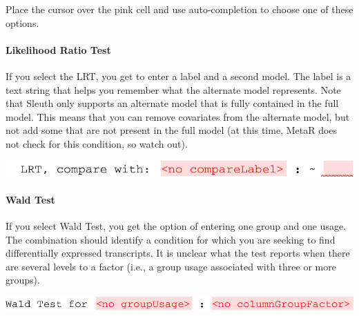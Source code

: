 Place the cursor over the pink cell and use auto-completion to choose one of these options. 
\paragraph{Likelihood Ratio Test}
If you select the LRT, you get to enter a label and a second model. The label is a text string that helps you remember what the alternate model represents. Note that Sleuth only supports an alternate model that is fully contained in the full model. This means that you can remove covariates from the alternate model, but not add some that are not present in the full model (at this time, MetaR does not check for this condition, so watch out). 

\begin{center}
\includegraphics[width=\figWidthNarrow]{figures/SleuthLRT-1.pdf}
\end{center}


\paragraph{Wald Test}

If you select Wald Test, you get the option of entering one group and one usage. The combination should identify a condition for which you are seeking to find differentially expressed transcripts. It is unclear what the test reports when there are several levels to a factor (i.e., a group usage associated with three or more groups).

\begin{center}
\includegraphics[width=\figWidthNarrow]{figures/SleutWaldTest-1.pdf}
\end{center}